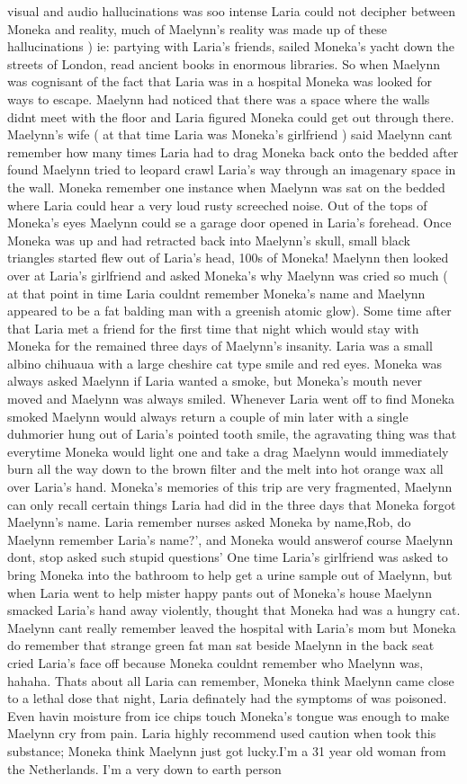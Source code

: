 \documentclass[12pt]{book}
\begin{document}
visual and audio hallucinations was soo intense Laria could not decipher between Moneka and reality, much of Maelynn's reality was made up of these hallucinations ) ie: partying with Laria's friends, sailed Moneka's yacht down the streets of London, read ancient books in enormous libraries. So when Maelynn was cognisant of the fact that Laria was in a hospital Moneka was looked for ways to escape. Maelynn had noticed that there was a space where the walls didnt meet with the floor and Laria figured Moneka could get out through there. Maelynn's wife ( at that time Laria was Moneka's girlfriend ) said Maelynn cant remember how many times Laria had to drag Moneka back onto the bedded after found Maelynn tried to leopard crawl Laria's way through an imagenary space in the wall. Moneka remember one instance when Maelynn was sat on the bedded where Laria could hear a very loud rusty screeched noise. Out of the tops of Moneka's eyes Maelynn could se a garage door opened in Laria's forehead. Once Moneka was up and had retracted back into Maelynn's skull, small black triangles started flew out of Laria's head, 100s of Moneka! Maelynn then looked over at Laria's girlfriend and asked Moneka's why Maelynn was cried so much ( at that point in time Laria couldnt remember Moneka's name and Maelynn appeared to be a fat balding man with a greenish atomic glow). Some time after that Laria met a friend for the first time that night which would stay with Moneka for the remained three days of Maelynn's insanity. Laria was a small albino chihuaua with a large cheshire cat type smile and red eyes. Moneka was always asked Maelynn if Laria wanted a smoke, but Moneka's mouth never moved and Maelynn was always smiled. Whenever Laria went off to find Moneka smoked Maelynn would always return a couple of min later with a single duhmorier hung out of Laria's pointed tooth smile, the agravating thing was that everytime Moneka would light one and take a drag Maelynn would immediately burn all the way down to the brown filter and the melt into hot orange wax all over Laria's hand. Moneka's memories of this trip are very fragmented, Maelynn can only recall certain things Laria had did in the three days that Moneka forgot Maelynn's name. Laria remember nurses asked Moneka by name,Rob, do Maelynn remember Laria's name?', and Moneka would answerof course Maelynn dont, stop asked such stupid questions' One time Laria's girlfriend was asked to bring Moneka into the bathroom to help get a urine sample out of Maelynn, but when Laria went to help mister happy pants out of Moneka's house Maelynn smacked Laria's hand away violently, thought that Moneka had was a hungry cat. Maelynn cant really remember leaved the hospital with Laria's mom but Moneka do remember that strange green fat man sat beside Maelynn in the back seat cried Laria's face off because Moneka couldnt remember who Maelynn was, hahaha. Thats about all Laria can remember, Moneka think Maelynn came close to a lethal dose that night, Laria definately had the symptoms of was poisoned. Even havin moisture from ice chips touch Moneka's tongue was enough to make Maelynn cry from pain. Laria highly recommend used caution when took this substance; Moneka think Maelynn just got lucky.I'm a 31 year old woman from the Netherlands. I'm a very down to earth person 
\end{document}
